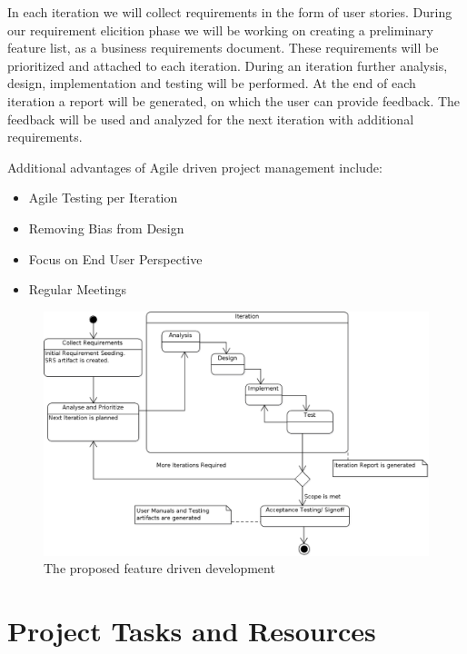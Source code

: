 \documentclass{journal}
\begin{document}
In each iteration we will collect requirements in the form of user stories. During our requirement elicition phase we will be working on creating a preliminary feature list, as a business requirements document. These requirements will be 
prioritized and attached to each iteration. During an iteration further analysis, design, implementation and testing will be performed. At the end of each iteration a report will be generated, on which the user can provide feedback. The
feedback will be used and analyzed for the next iteration with additional requirements.

Additional advantages of Agile driven project management include:
\begin{itemize}

\item{Agile Testing per Iteration}
\item{Removing Bias from Design}
\item{Focus on End User Perspective}
\item{Regular Meetings}

\end{itemize}

\begin{figure}[!h]
\begin{center}
\includegraphics[width=18cm]{images/Methodology} \caption{ The proposed feature driven development } \label{fig:methods}

\end{center}
\end{figure}

\newpage

\section{Project Tasks and Resources}
\end{document}
